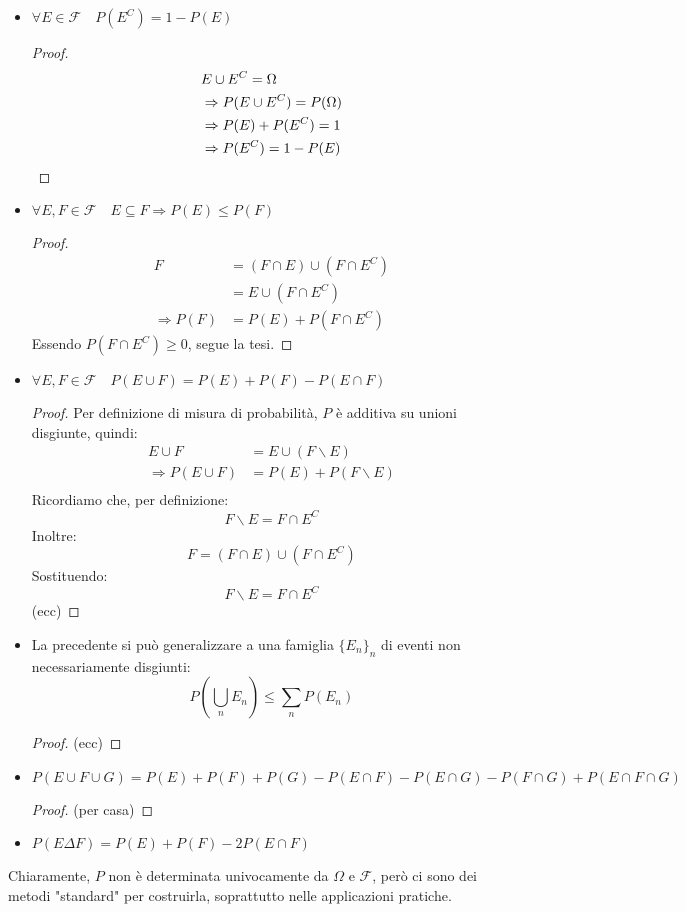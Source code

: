 \documentclass{article}
\theoremstyle{plain}
\theoremstyle{definition}
\theoremstyle{remark}
\begin{document}
\begin{itemize}
	\item $\forall E\in\mathcal{F}\quad P(E^C)=1-P(E)$
	\begin{proof}
		\begin{align*}
			&E\cup E^C=\Omega\\
			&\Rightarrow P(E\cup E^C)=P(\Omega)\\
			&\Rightarrow P(E)+P(E^C)=1\\
			&\Rightarrow P(E^C)=1-P(E)\qedhere
		\end{align*}
	\end{proof}
	\item $\forall E,F\in\mathcal{F}\quad E\subseteq F\Rightarrow P(E)\leq P(F)$
	\begin{proof}
		\begin{align*}
			F&=(F\cap E)\cup(F\cap E^C)\\
			&=E\cup(F\cap E^C)\\
			\Rightarrow P(F)&=P(E)+P(F\cap E^C)
		\end{align*}
		Essendo $P(F\cap E^C)\geq0$, segue la tesi.
	\end{proof}
	\item $\forall E,F\in\mathcal{F}\quad P(E\cup F)=P(E)+P(F)-P(E\cap F)$
	\begin{proof}
		Per definizione di misura di probabilità, $P$ è additiva su unioni disgiunte, quindi:
		\begin{align*}
			E\cup F&=E\cup (F\smallsetminus E)\\
			\Rightarrow P(E\cup F)&=P(E)+P(F\smallsetminus E)\\
		\end{align*}
		Ricordiamo che, per definizione:
		\begin{equation*}
			F\smallsetminus E=F\cap E^C
		\end{equation*}
		Inoltre:
		\begin{equation*}
			F=(F\cap E)\cup(F\cap E^C)
		\end{equation*}
		Sostituendo:
		\begin{equation*}
			F\smallsetminus E=F\cap E^C
		\end{equation*}
		(ecc)%
	\end{proof}
	\item La precedente si può generalizzare a una famiglia $\{E_n\}_n$ di eventi non necessariamente disgiunti:
	\begin{equation*}
		P(\bigcup_n E_n)\leq \sum_n P(E_n)
	\end{equation*}
	\begin{proof}
		(ecc)
	\end{proof}
	\item $P(E\cup F\cup G)=P(E)+P(F)+P(G)-P(E\cap F)-P(E\cap G)-P(F\cap G)+P(E\cap F\cap G)$
	\begin{proof}
		(per casa)
	\end{proof}
	\item $P(E\Delta F)=P(E)+P(F)-2P(E\cap F)$
\end{itemize}
Chiaramente, $P$ non è determinata univocamente da $\Omega$ e $\mathcal{F}$, però ci sono dei metodi "standard" per costruirla, soprattutto nelle applicazioni pratiche.
\end{document}
